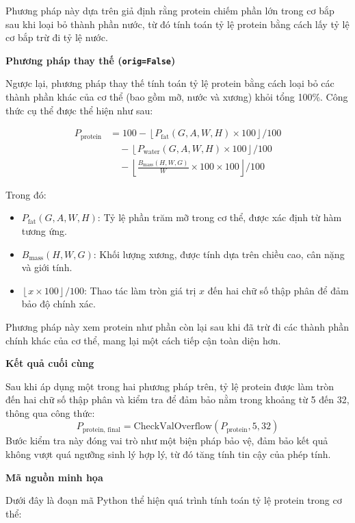 Phương pháp này dựa trên giả định rằng protein chiếm phần lớn trong cơ bắp sau khi loại bỏ thành phần nước, từ đó tính toán tỷ lệ protein bằng cách lấy tỷ lệ cơ bắp trừ đi tỷ lệ nước.

\textbf{Phương pháp thay thế (\texttt{orig=False})}

Ngược lại, phương pháp thay thế tính toán tỷ lệ protein bằng cách loại bỏ các thành phần khác của cơ thể (bao gồm mỡ, nước và xương) khỏi tổng 100\%. Công thức cụ thể được thể hiện như sau:

\begin{align*}
P_{\text{protein}} &= 100 - \left\lfloor P_{\text{fat}}(G, A, W, H) \times 100 \right\rfloor / 100 \\
&\quad - \left\lfloor P_{\text{water}}(G, A, W, H) \times 100 \right\rfloor / 100 \\
&\quad - \left\lfloor \frac{B_{\text{mass}}(H, W, G)}{W} \times 100 \times 100 \right\rfloor / 100
\end{align*}

Trong đó:
\begin{itemize}
    \item \( P_{\text{fat}}(G, A, W, H) \): Tỷ lệ phần trăm mỡ trong cơ thể, được xác định từ hàm tương ứng.
    \item \( B_{\text{mass}}(H, W, G) \): Khối lượng xương, được tính dựa trên chiều cao, cân nặng và giới tính.
    \item \( \left\lfloor x \times 100 \right\rfloor / 100 \): Thao tác làm tròn giá trị \( x \) đến hai chữ số thập phân để đảm bảo độ chính xác.
\end{itemize}

Phương pháp này xem protein như phần còn lại sau khi đã trừ đi các thành phần chính khác của cơ thể, mang lại một cách tiếp cận toàn diện hơn.

\textbf{Kết quả cuối cùng}

Sau khi áp dụng một trong hai phương pháp trên, tỷ lệ protein được làm tròn đến hai chữ số thập phân và kiểm tra để đảm bảo nằm trong khoảng từ 5 đến 32, thông qua công thức:
\[
P_{\text{protein, final}} = \text{CheckValOverflow}(P_{\text{protein}}, 5, 32)
\]
Bước kiểm tra này đóng vai trò như một biện pháp bảo vệ, đảm bảo kết quả không vượt quá ngưỡng sinh lý hợp lý, từ đó tăng tính tin cậy của phép tính.

\textbf{Mã nguồn minh họa}

Dưới đây là đoạn mã Python thể hiện quá trình tính toán tỷ lệ protein trong cơ thể:

